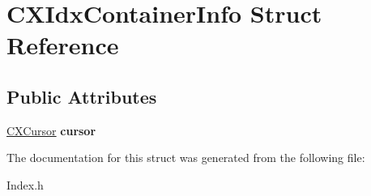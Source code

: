 \hypertarget{structCXIdxContainerInfo}{}\section{C\+X\+Idx\+Container\+Info Struct Reference}
\label{structCXIdxContainerInfo}
\subsection*{Public Attributes}
\begin{DoxyCompactItemize}
\item 
\mbox{\label{structCXIdxContainerInfo_a737858b5e1e72389926828bb6916c202}} 
\mbox{\hyperlink{structCXCursor}{C\+X\+Cursor}} {\bfseries cursor}
\end{DoxyCompactItemize}


The documentation for this struct was generated from the following file\+:\begin{DoxyCompactItemize}
\item 
Index.\+h\end{DoxyCompactItemize}
